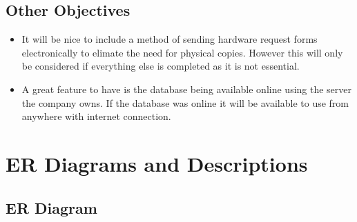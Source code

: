 \subsection{Other Objectives}

\begin{itemize}
\item It will be nice to include a method of sending hardware request forms electronically to elimate the need for physical copies. However this will only be considered if everything else is completed as it is not essential.
\item A great feature to have is the database being available online using the server the company owns. If the database was online it will be available to use from anywhere with internet connection.
\end{itemize}

\section{ER Diagrams and Descriptions}

\subsection{ER Diagram}

